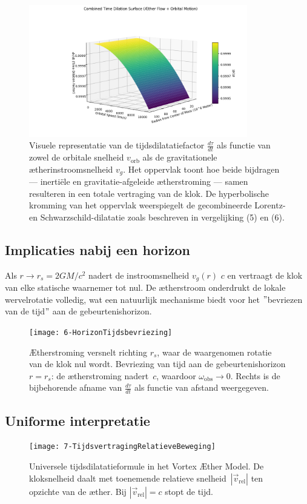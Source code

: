 \begin{figure}[htbp]
    \centering
    \includegraphics[width=0.85\textwidth]{TimeDialationCombined}
    \caption{Visuele representatie van de tijdsdilatatiefactor \( \frac{d\tau}{dt} \) als functie van zowel de orbitale snelheid \( v_{\text{orb}} \) als de gravitationele ætherinstroomsnelheid \( v_g \). Het oppervlak toont hoe beide bijdragen — inertiële en gravitatie-afgeleide ætherstroming — samen resulteren in een totale vertraging van de klok. De hyperbolische kromming van het oppervlak weerspiegelt de gecombineerde Lorentz- en Schwarzschild-dilatatie zoals beschreven in vergelijking (5) en (6).}
    \label{fig:TimeDialationCombined}
\end{figure}

\subsection*{Implicaties nabij een horizon}

Als $r \to r_s = 2GM/c^2$ nadert de instroomsnelheid $v_g(r)$ $c$ en vertraagt de klok van elke statische waarnemer tot nul. De ætherstroom onderdrukt de lokale wervelrotatie volledig, wat een natuurlijk mechanisme biedt voor het \("\)bevriezen van de tijd\("\) aan de gebeurtenishorizon.


\begin{figure}[htbp]
    \centering
    \texttt{[image: 6-HorizonTijdsbevriezing]}
    \caption{Ætherstroming versnelt richting $r_s$, waar de waargenomen rotatie van de klok nul wordt. Bevriezing van tijd aan de gebeurtenishorizon $r = r_s$: de ætherstroming nadert~$c$, waardoor $\omega_{\mathrm{obs}} \to 0$. Rechts is de bijbehorende afname van $\frac{d\tau}{dt}$ als functie van afstand weergegeven.}
    \label{fig:HorizonTijdsbevriezing}
\end{figure}

\subsection*{Uniforme interpretatie}
\begin{figure}[htbp]
    \centering
    \texttt{[image: 7-TijdsvertragingRelatieveBeweging]}
    \caption{Universele tijdsdilatatieformule in het Vortex Æther Model. De kloksnelheid daalt met toenemende relatieve snelheid~$|\vec{v}_{\mathrm{rel}}|$ ten opzichte van de æther. Bij $|\vec{v}_{\mathrm{rel}}| = c$ stopt de tijd.}
    \label{fig:TijdsvertragingRelatieveBeweging}
\end{figure}

